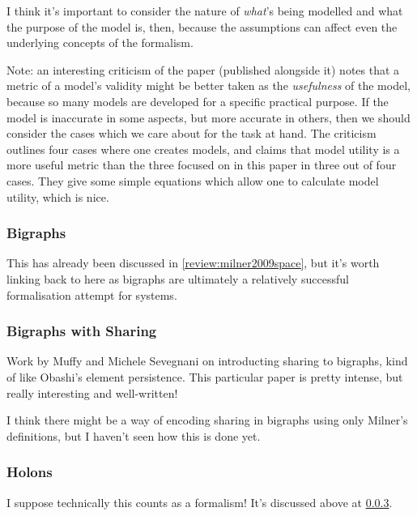 \documentclass[12pt]{article}
\begin{document}
I think it's important to consider the nature of \emph{what}'s being modelled
and what the purpose of the model is, then, because the assumptions can affect
even the underlying concepts of the formalism.\par

Note: an interesting criticism of the paper (published alongside it) notes that
a metric of a model's validity might be better taken as the \emph{usefulness} of
the model, because so many models are developed for a specific practical
purpose. If the model is inaccurate in some aspects, but more accurate in
others, then we should consider the cases which we care about for the task at
hand. The criticism outlines four cases where one creates models, and claims
that model utility is a more useful metric than the three focused on in this
paper in three out of four cases. They give some simple equations which allow
one to calculate model utility, which is nice.\par

\subsubsection{Bigraphs}

This has already been discussed in \ref{review:milner2009space}, but it's worth
linking back to here as bigraphs are ultimately a relatively successful
formalisation attempt for systems.

\subsubsection{Bigraphs with Sharing}

Work by Muffy and Michele Sevegnani on introducting sharing to bigraphs, kind of
like Obashi's element persistence. \cite{sevegnani2015bigraphs} This particular
paper is pretty intense, but really interesting and well-written!\par

I think there might be a way of encoding sharing in bigraphs using only Milner's
definitions, but I haven't seen how this is done yet. 

\subsubsection{Holons}\label{review:blair2015holons}  %
I suppose technically this counts as a formalism! It's discussed above at \ref{review:blair2015holons}.
\end{document}
